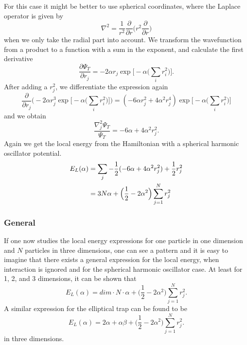 \documentclass[norsk,a4paper,12pt]{article}
\begin{document}
For this case it might be better to use spherical coordinates, where the Laplace operator is given by
\begin{equation}
\nabla^2=\frac{1}{r^2}\frac{\partial}{\partial r}\bigg(r^2\frac{\partial}{\partial r}\bigg)
\end{equation}
when we only take the radial part into account. We transform the wavefunction from a product to a function with a sum in the exponent, and calculate the first derivative
\begin{equation}
\frac{\partial\Psi_T}{\partial r_j}=-2\alpha r_j \exp\bigg[-\alpha\bigg(\sum_i r_i^2\bigg)\bigg].
\end{equation}
After adding a $r_j^2$, we differentiate the expression again
\begin{equation*}
\frac{\partial}{\partial r_j}\bigg(-2\alpha r_j^3\exp\Big[-\alpha\Big(\sum_i r_i^2\Big)\Big]\bigg)
=(-6\alpha r_j^2 + 4\alpha^2r_j^4)\exp\Big[-\alpha\Big(\sum_i r_i^2\Big)\Big]
\end{equation*}
and we obtain
\begin{equation}
\frac{\nabla_j^2\Psi_T}{\Psi_T}=-6\alpha+4\alpha^2r_j^2.
\end{equation}
Again we get the local energy from the Hamiltonian with a spherical harmonic oscillator potential. 
\begin{align}
E_L(\alpha)&=\sum_j-\frac{1}{2}(-6\alpha+4\alpha^2r_j^2) + \frac{1}{2}r_j^2\notag\\
&=3N\alpha + \Big(\frac{1}{2}-2\alpha^2\Big)\sum_{j=1}^Nr_j^2
\end{align}

\subsubsection{General}
If one now studies the local energy expressions for one particle in one dimension and $N$ particles in three dimensions, one can see a pattern and it is easy to imagine that there exists a general expression for the local energy, when interaction is ignored and for the spherical harmonic oscillator case. At least for 1, 2, and 3 dimensions, it can be shown that 
\begin{equation}
E_L(\alpha)=dim\cdot N\cdot \alpha+\Big(\frac{1}{2}-2\alpha^2\Big)\sum_{j=1}^Nr_j^2.
\end{equation}
A similar expression for the elliptical trap can be found to be
\begin{equation}
E_L(\alpha)=2\alpha+\alpha\beta+\Big(\frac{1}{2}-2\alpha^2\Big)\sum_{j=1}^Nr_j^2.
\end{equation}
in three dimensions.
\end{document}
